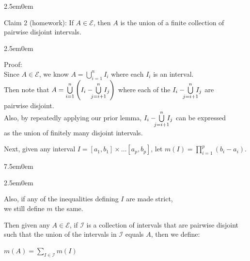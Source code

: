 \documentclass{book}
\newcommand{\teachComment}{
   \color{Orange}%
   \fontsize{12}{14}\selectfont%
}
\newcommand{\exTwo}{%
   \color{RedViolet}%
   \fontsize{13}{15}\selectfont%
}
\newenvironment{myIndent}{%
   \begin{adjustwidth}{2.5em}{0em}%
}{%
   \end{adjustwidth}%
}
\newenvironment{myTindent}{%
   \begin{adjustwidth}{7.5em}{0em}%
}{%
   \end{adjustwidth}%
}
\newcommand{\retTwo}{\hfill\bigbreak}
\begin{document}
{\begin{myIndent}
   Claim 2 (homework): If $A \in \mathcal{E}$, then $A$ is the union of a finite collection of\\ pairwise disjoint intervals.
   
   {\begin{myIndent}\exTwo
      Proof:\\ [-4pt]
      Since $A \in \mathcal{E}$, we know $A = \bigcup\limits_{i=1}^n I_i$ where each $I_i$ is an interval.\\ [-4pt]

      Then note that $A = \bigcup\limits_{i=1}^n \left(I_i - \hspace{-0.5em}\bigcup\limits_{j=i+1}^n \hspace{-0.5em}I_j\right)$ where each of the $I_i - \hspace{-0.5em}\bigcup\limits_{j=i+1}^n \hspace{-0.5em}I_j$ are\\ [-12pt] pairwise disjoint.\\ [-4pt]
      
      Also, by repeatedly applying our prior lemma, $I_i - \hspace{-0.5em}\bigcup\limits_{j=i+1}^n \hspace{-0.5em}I_j$ can be expressed\\ [-10pt] as the union of finitely many disjoint intervals.\retTwo
   \end{myIndent}}
\end{myIndent}}

Next, given any interval $I = [a_1, b_1]\times \ldots [a_p, b_p]$, let $m(I) = \prod\limits_{i=1}^p(b_i - a_i)$.\\ [-4pt]
{\begin{myTindent}\begin{myIndent}\teachComment
   Also, if any of the inequalities defining $I$ are made strict,\\ we still define $m$ the same.\retTwo
\end{myIndent}\end{myTindent}}

\newpage

Then given any $A \in \mathcal{E}$, if $\mathcal{I}$ is a collection of intervals that are pairwise disjoint\\ such that the union of the intervals in $\mathcal{I}$ equals $A$, then we define:

{\center $m(A) = \sum\limits_{I \in \mathcal{I}}m(I)$\retTwo\par}
\end{document}
